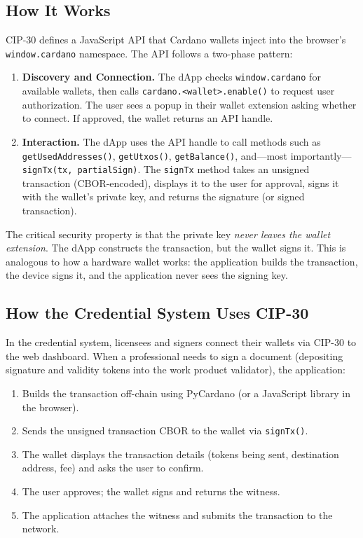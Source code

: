 \subsection{How It Works}

CIP-30 defines a JavaScript API that Cardano wallets inject into the
browser's \texttt{window.cardano} namespace.  The API follows a two-phase
pattern:

\begin{enumerate}[nosep]
  \item \textbf{Discovery and Connection.}  The dApp checks
    \texttt{window.cardano} for available wallets, then calls
    \texttt{cardano.<wallet>.enable()} to request user authorization.  The
    user sees a popup in their wallet extension asking whether to connect.
    If approved, the wallet returns an API handle.
  \item \textbf{Interaction.}  The dApp uses the API handle to call
    methods such as \texttt{getUsedAddresses()},
    \texttt{getUtxos()}, \texttt{getBalance()}, and---most
    importantly---\texttt{signTx(tx, partialSign)}.  The
    \texttt{signTx} method takes an unsigned transaction (CBOR-encoded),
    displays it to the user for approval, signs it with the wallet's private
    key, and returns the signature (or signed transaction).
\end{enumerate}

The critical security property is that the private key \emph{never leaves
the wallet extension}.  The dApp constructs the transaction, but the wallet
signs it.  This is analogous to how a hardware wallet works: the application
builds the transaction, the device signs it, and the application never sees
the signing key.

\subsection{How the Credential System Uses CIP-30}

In the credential system, licensees and signers connect their wallets via
CIP-30 to the web dashboard.  When a professional needs to sign a document
(depositing signature and validity tokens into the work product validator),
the application:

\begin{enumerate}[nosep]
  \item Builds the transaction off-chain using PyCardano (or a JavaScript
    library in the browser).
  \item Sends the unsigned transaction CBOR to the wallet via
    \texttt{signTx()}.
  \item The wallet displays the transaction details (tokens being sent,
    destination address, fee) and asks the user to confirm.
  \item The user approves; the wallet signs and returns the witness.
  \item The application attaches the witness and submits the transaction to
    the network.
\end{enumerate}

